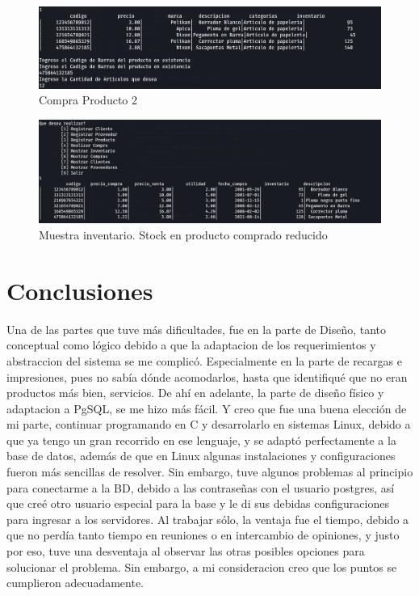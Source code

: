 \documentclass[letter,12pt]{article}
\begin{document}
\begin{center}
\begin{figure}[H]
\includegraphics[scale=.45]{func4-2.png}
\caption{Compra Producto 2}
\end{figure}
\begin{figure}[H]
\includegraphics[scale=.40]{func4-3.png}
\caption{Muestra inventario. Stock en producto comprado reducido}
\end{figure}
\end{center}
\newpage
\section{Conclusiones}
Una de las partes que tuve más dificultades, fue en la parte de Diseño, tanto conceptual como lógico debido a que la adaptacion de los requerimientos y abstraccion del sistema se me complicó. Especialmente en la parte de recargas e impresiones, pues no sabía dónde acomodarlos, hasta que identifiqué que no eran productos más bien, servicios. De ahí en adelante, la parte de diseño físico y adaptacion a PgSQL, se me hizo más fácil. Y creo que fue una buena elección de mi parte, continuar programando en C y desarrolarlo en sistemas Linux, debido a que ya tengo un gran recorrido en ese lenguaje, y se adaptó perfectamente a la base de datos, además de que en Linux algunas instalaciones y configuraciones fueron más sencillas de resolver. Sin embargo, tuve algunos problemas al principio para conectarme a la BD, debido a las contraseñas con el usuario postgres, así que creé otro usuario especial para la base y le di sus debidas configuraciones para ingresar a los servidores. Al trabajar sólo, la ventaja fue el tiempo, debido a que no perdía tanto tiempo en reuniones o en intercambio de opiniones, y justo por eso, tuve una desventaja al observar las otras posibles opciones para solucionar el problema. Sin embargo, a mi consideracion creo que los puntos se cumplieron adecuadamente.
\end{document}
